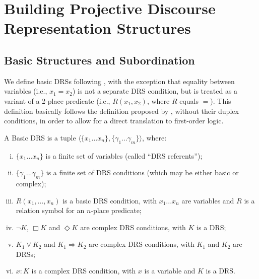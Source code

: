 \section{Building Projective Discourse Representation Structures}


\subsection{Basic Structures and Subordination}

We define basic DRSs following , with the
exception that equality between variables (i.e., $x_1=x_2$) is not
a separate DRS condition, but is treated as a variant of a 2-place predicate
(i.e., $R(x_1,x_2)$, where $R$ equals $=$). This definition basically
follows the definition proposed by , without
their duplex conditions, in order to allow for a direct translation to
first-order logic.

\begin{definition} \label{def:bDRS}
A Basic DRS is a tuple $\langle \{x_1 ... x_n\},\{\gamma_1 ... \gamma_m\} 
\rangle$, where:
 \begin{enumerate}[i.]
  \item $\{x_1 ... x_n\}$ is a finite set of variables (called ``DRS
    referents'');
  \item $\{\gamma_1 ... \gamma_m\}$ is a finite set of DRS conditions (which
    may be either basic or complex);
  \item\label{def:bDRS:Rel} $R(x_1, ..., x_n)$ is a basic DRS condition,
    with $x_1 ... x_n$ are variables and $R$ is a relation symbol for an
    $n$-place predicate;
  \item $\neg K$, $\Box K$ and $\Diamond K$ are complex DRS conditions, with
    $K$ is a DRS;
  \item $K_1 \vee K_2$ and $K_1 \Rightarrow K_2$ are complex DRS conditions,
    with $K_1$ and $K_2$ are DRSs;
  \item \label{def:bDRS:Prop} $x:K$ is a complex DRS condition, with $x$ is
    a variable and $K$ is a DRS.
 \end{enumerate} 
\end{definition}


